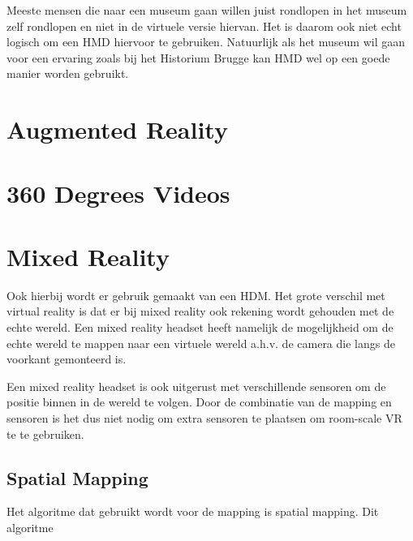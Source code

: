 Meeste mensen die naar een museum gaan willen juist rondlopen in het museum zelf rondlopen en niet in de virtuele versie hiervan. Het is daarom ook niet echt logisch om een HMD hiervoor te gebruiken. Natuurlijk als het museum wil gaan voor een ervaring zoals bij het Historium Brugge kan HMD wel op een goede manier worden gebruikt.

\section{Augmented Reality}
\section{360 Degrees Videos}
\section{Mixed Reality}
Ook hierbij wordt er gebruik gemaakt van een HDM. Het grote verschil met virtual reality is dat er bij mixed reality ook rekening wordt gehouden met de echte wereld. Een mixed reality headset heeft namelijk de mogelijkheid om de echte wereld te mappen naar een virtuele wereld a.h.v. de camera die langs de voorkant gemonteerd is.

Een mixed reality headset is ook uitgerust met verschillende sensoren om de positie binnen in de wereld te volgen. Door de combinatie van de mapping en sensoren is het dus niet nodig om extra sensoren te plaatsen om room-scale VR te te gebruiken.
\subsection{Spatial Mapping}
Het algoritme dat gebruikt wordt voor de mapping is spatial mapping. Dit algoritme %